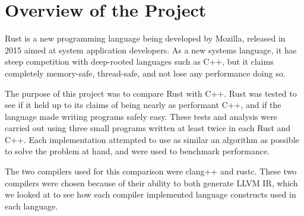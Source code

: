 \chapter{Overview of the Project}
\par Rust is a new programming language being developed by Mozilla, released in 2015
aimed at system application developers. As a new systems language, it has steep
competition with deep-rooted languages such as C++, but it claims completely
memory-safe, thread-safe, and not lose any performance doing so.

\par The purpose of this project was to compare Rust with C++. Rust
was tested to see if it held up to its claims of being nearly as performant C++,
and if the language made writing programs safely easy. These tests and analysis
were carried out using three small programs written at least twice in each Rust and C++. Each
implementation attempted to use as similar an algorithm as possible to solve
the problem at hand, and were used to benchmark performance.

\par The two compilers used for this comparison were clang++ and rustc.
These two compilers were chosen because of their ability to both generate LLVM
IR, which we looked at to see how each compiler implemented language constructs
used in each language. 
